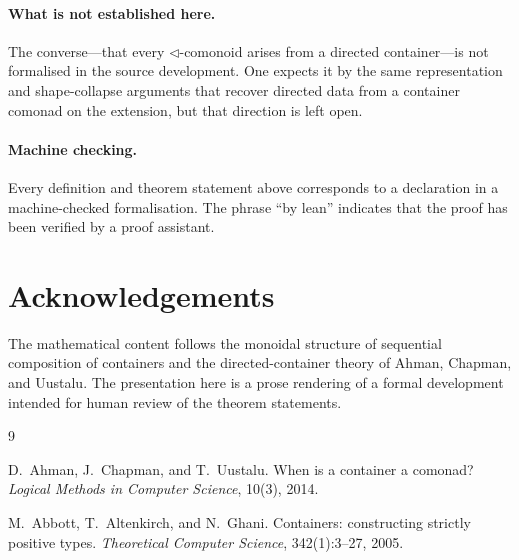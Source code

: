 \documentclass[11pt,a4paper]{article}
\theoremstyle{plain}
\theoremstyle{definition}
\begin{document}
\paragraph{What is not established here.}
The converse---that every $\triangleleft$-comonoid arises from a directed
container---is not formalised in the source development. One expects it by
the same representation and shape-collapse arguments that recover directed
data from a container comonad on the extension, but that direction is left
open.

\paragraph{Machine checking.}
Every definition and theorem statement above corresponds to a declaration in a
machine-checked formalisation. The phrase ``by lean'' indicates that the proof
has been verified by a proof assistant.

\section*{Acknowledgements}

The mathematical content follows the monoidal structure of sequential
composition of containers and the directed-container theory of Ahman, Chapman,
and Uustalu. The presentation here is a prose rendering of a formal
development intended for human review of the theorem statements.

\begin{thebibliography}{9}

D.~Ahman, J.~Chapman, and T.~Uustalu.
\newblock When is a container a comonad?
\newblock \emph{Logical Methods in Computer Science}, 10(3), 2014.

M.~Abbott, T.~Altenkirch, and N.~Ghani.
\newblock Containers: constructing strictly positive types.
\newblock \emph{Theoretical Computer Science}, 342(1):3--27, 2005.

\end{thebibliography}
\end{document}
